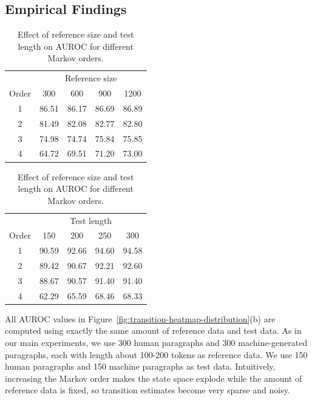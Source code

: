 \documentclass{article}
\theoremstyle{plain}
\theoremstyle{definition}
\theoremstyle{remark}
\begin{document}
\subsection{Empirical Findings}
\begin{table}[h]
\centering
\begin{minipage}{0.48\textwidth} 
\centering
\small
\begin{tabular}{ccccc}
\toprule
 & \multicolumn{4}{c}{Reference size} \\
Order & 300 & 600 & 900 & 1200 \\
\midrule
1 & 86.51 & 86.17 & 86.69 & 86.89 \\
2 & 81.49 & 82.08 & 82.77 & 82.80 \\
3 & 74.98 & 74.74 & 75.84 & 75.85 \\
4 & 64.72 & 69.51 & 71.20 & 73.00 \\
\bottomrule
\end{tabular} 
\caption*{(a) AUROC vs. reference size}
\end{minipage}
\hfill
\begin{minipage}{0.48\textwidth}
\centering
\small
\begin{tabular}{ccccc}
\toprule
 & \multicolumn{4}{c}{Test length} \\
Order & 150 & 200 & 250 & 300 \\
\midrule
1 & 90.59 & 92.66 & 94.60 & 94.58 \\
2 & 89.42 & 90.67 & 92.21 & 92.60 \\
3 & 88.67 & 90.57 & 91.40 & 91.40 \\
4 & 62.29 & 65.59 & 68.46 & 68.33 \\
\bottomrule
\end{tabular}
\caption*{(b) AUROC vs. test length}
\end{minipage}

\caption{Effect of reference size and test length on AUROC for different Markov orders.}

\label{tab:aurox-vs-test}
\end{table}
All AUROC values in Figure~\ref{fig:transition-heatmap-distribution}(b) are computed using exactly the same amount of reference data and test data. As in our main experiments, we use 300 human paragraphs and 300 machine-generated paragraphs, each with length about 100-200 tokens as reference data. We use 150 human paragraphs and 150 machine paragraphs as test data. Intuitively, increasing the Markov order makes the state space explode while the amount of reference data is fixed, so transition estimates become very sparse and noisy.
\end{document}
